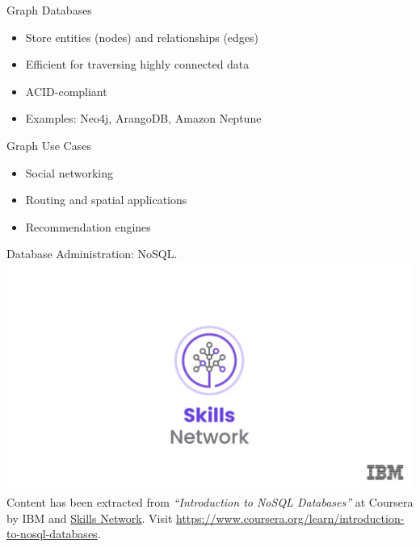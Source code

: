 \documentclass[aspectratio=169]{beamer}
\begin{document}
\begin{frame}{Graph Databases}
\begin{itemize}
    \item Store entities (nodes) and relationships (edges)
    \item Efficient for traversing highly connected data
    \item ACID-compliant
    \item Examples: Neo4j, ArangoDB, Amazon Neptune
\end{itemize}
\end{frame}

\begin{frame}{Graph Use Cases}
\begin{itemize}
    \item Social networking
    \item Routing and spatial applications
    \item Recommendation engines
\end{itemize}
\end{frame}

\begin{frame}{Database Administration: NoSQL.}
    \centering
    \includegraphics[width=0.75\linewidth]{figures/skills_network} \\
    \vspace{2mm}
    {
        \scriptsize
        Content has been extracted from \textit{``Introduction to NoSQL Databases''} at Coursera by IBM and \href{https://skills.network/}{Skills Network}. Visit \url{https://www.coursera.org/learn/introduction-to-nosql-databases}.
    }
\end{frame}
\end{document}
